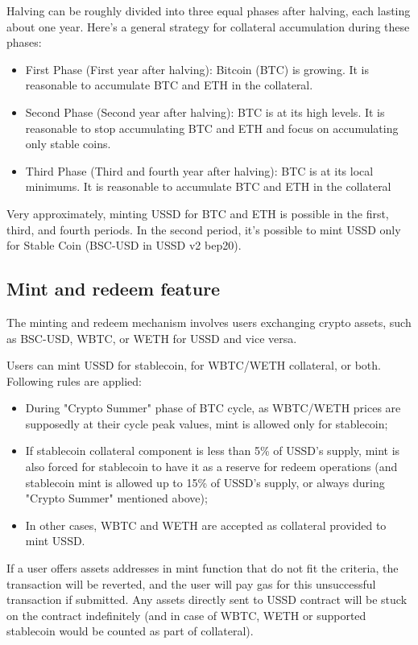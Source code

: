 Halving can be roughly divided into three equal phases after halving, each lasting about one year. Here's a general strategy for collateral accumulation during these phases:

\begin{itemize}
	\item First Phase (First year after halving): Bitcoin (BTC) is growing. It is reasonable to accumulate BTC and ETH in the collateral.
	\item Second Phase (Second year after halving): BTC is at its high levels. It is reasonable to stop accumulating BTC and ETH and focus on accumulating only stable coins.
	\item Third Phase (Third and fourth year after halving): BTC is at its local minimums. It is reasonable to accumulate BTC and ETH in the collateral
\end{itemize}

Very approximately, minting USSD for BTC and ETH is possible in the first, third, and fourth periods. In the second period, it’s possible to mint USSD only for Stable Coin (BSC-USD in USSD v2 bep20).

\subsection{Mint and redeem feature}

The minting and redeem mechanism involves users exchanging crypto assets, such as BSC-USD, WBTC, or WETH for USSD and vice versa.

Users can mint USSD for stablecoin, for WBTC/WETH collateral, or both. Following rules are applied:



\begin{itemize}
   \item During "Crypto Summer" phase of BTC cycle, as WBTC/WETH prices are supposedly at their cycle peak values, mint is allowed only for stablecoin;
   \item If stablecoin collateral component is less than 5\% of USSD's supply, mint is also forced for stablecoin to have it as a reserve for redeem operations (and stablecoin mint is allowed up to 15\% of USSD's supply, or always during "Crypto Summer" mentioned above);
   \item In other cases, WBTC and WETH are accepted as collateral provided to mint USSD.
\end{itemize}

If a user offers assets addresses in mint function that do not fit the criteria, the transaction will be reverted, and the user will pay gas for this unsuccessful transaction if submitted. Any assets directly sent to USSD contract will be stuck on the contract indefinitely (and in case of WBTC, WETH or supported stablecoin would be counted as part of collateral).

